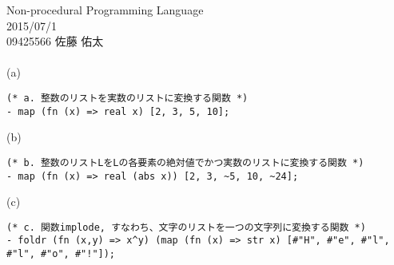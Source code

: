 
\oddsidemargin  -5mm
\textwidth      170mm
\textheight     250mm
\topmargin      -20mm



Non-procedural Programming Language
\\
2015/07/1
\\
09425566
佐藤 佑太
\\
\\
(a)
\begin{verbatim}
(* a. 整数のリストを実数のリストに変換する関数 *)
- map (fn (x) => real x) [2, 3, 5, 10];
\end{verbatim}


(b)
\begin{verbatim}
(* b. 整数のリストLをLの各要素の絶対値でかつ実数のリストに変換する関数 *)
- map (fn (x) => real (abs x)) [2, 3, ~5, 10, ~24];
\end{verbatim}


(c)
\begin{verbatim}
(* c. 関数implode, すなわち、文字のリストを一つの文字列に変換する関数 *)
- foldr (fn (x,y) => x^y) (map (fn (x) => str x) [#"H", #"e", #"l", #"l", #"o", #"!"]); 
\end{verbatim}



